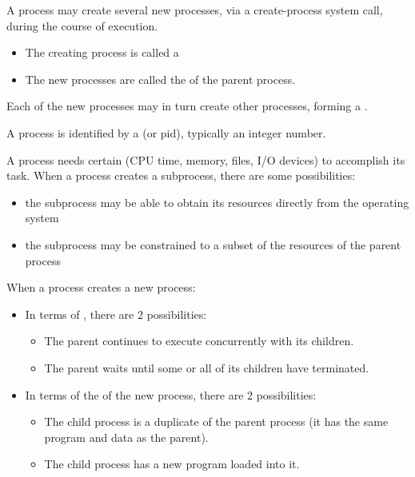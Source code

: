     \par A process may create several new processes, via a create-process system call, during the course of execution.
    \begin{itemize}
      \item The creating process is called a 
      \item The new processes are called the  of the parent process.
    \end{itemize}
    \par Each of the new processes may in turn create other processes, forming a .
    \par A process is identified by a  (or pid), typically an integer number.
    \par A process needs certain  (CPU time, memory, files, I/O devices) to accomplish its task. When a process creates a subprocess, there are some possibilities:
    \begin{itemize}
      \item the subprocess may be able to obtain its resources directly from the operating system
      \item the subprocess may be constrained to a subset of the resources of the parent process
    \end{itemize}
    \par When a process creates a new process:
    \begin{itemize}
      \item In terms of , there are 2 possibilities:
        \begin{itemize}
          \item The parent continues to execute concurrently with its children.
          \item The parent waits until some or all of its children have terminated.
        \end{itemize}
      \item In terms of the  of the new process, there are 2 possibilities:
          \begin{itemize}
            \item The child process is a duplicate of the parent process (it has the same
      program and data as the parent).
            \item The child process has a new program loaded into it.
          \end{itemize}
    \end{itemize}
